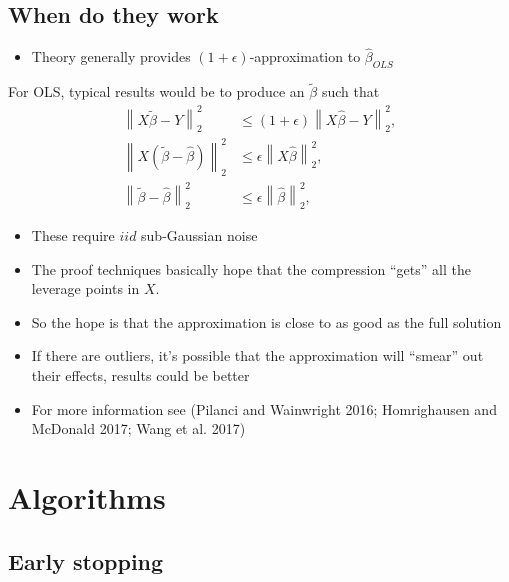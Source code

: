 \documentclass[]{article}
\providecommand{\tightlist}{%
  \setlength{\itemsep}{0pt}\setlength{\parskip}{0pt}}
\begin{document}
\hypertarget{when-do-they-work}{%
\subsection{When do they work}\label{when-do-they-work}}

\begin{itemize}
\tightlist
\item
  Theory generally provides \((1+\epsilon)\)-approximation to
  \(\widehat\beta_{OLS}\)
\end{itemize}

For OLS, typical results would be to produce an \(\tilde{\beta}\) such
that \[
\begin{aligned}
\left\lVert X\tilde{\beta} - Y \right\rVert_2^2 &\leq (1+\epsilon)  \left\lVert X\widehat{\beta} - Y \right\rVert_2^2,\\
\left\lVert X(\tilde{\beta} - \widehat{\beta}) \right\rVert_2^2 &\leq \epsilon\left\lVert X\widehat{\beta} \right\rVert_2^2,\\
\left\lVert \tilde{\beta} - \widehat{\beta} \right\rVert_2^2 &\leq \epsilon\left\lVert \widehat{\beta} \right\rVert_2^2,
\end{aligned}
\]

\begin{itemize}
\tightlist
\item
  These require \(iid\) sub-Gaussian noise
\item
  The proof techniques basically hope that the compression ``gets'' all
  the leverage points in \(X\).
\item
  So the hope is that the approximation is close to as good as the full
  solution
\item
  If there are outliers, it's possible that the approximation will
  ``smear'' out their effects, results could be better
\item
  For more information see (Pilanci and Wainwright 2016; Homrighausen
  and McDonald 2017; Wang et al. 2017)
\end{itemize}

\hypertarget{algorithms}{%
\section{Algorithms}\label{algorithms}}

\hypertarget{early-stopping}{%
\subsection{Early stopping}\label{early-stopping}}
\end{document}

